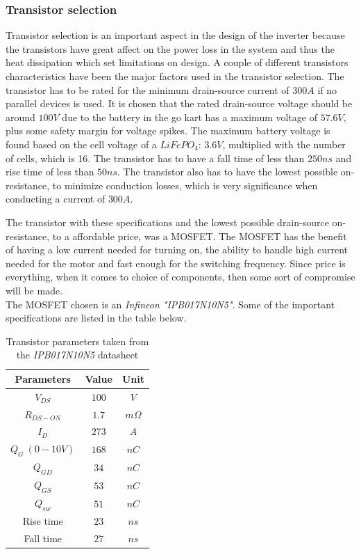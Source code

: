 \subsubsection{Transistor selection}
Transistor selection is an important aspect in the design of the inverter because the transistors have great affect on the power loss in the system and thus the heat dissipation which set limitations on design. 
A couple of different transistors characteristics have been the major factors used in the transistor selection.
The transistor has to be rated for the minimum drain-source current of $300 A$ if no parallel devices is used. It is chosen that the rated drain-source voltage should be around $100 V$ due to the battery in the go kart has a maximum voltage of $57.6V$, plus some safety margin for voltage spikes. 
The maximum battery voltage is found based on the cell voltage of a $LiFePO_4$: $3.6 V$, multiplied with the number of cells, which is 16. The transistor has to have a fall time of less than $250ns$ and rise time of less than $50ns$. The transistor also has to have the lowest possible on-resistance, to minimize conduction losses, which is very significance when conducting a current of $300A$.

The transistor with these specifications and the lowest possible drain-source on-resistance, to a affordable price, was a MOSFET. The MOSFET has the benefit of having a low current needed for turning on, the ability to handle high current needed for the motor and fast enough for the switching frequency. Since price is everything, when it comes to choice of components, then some sort of compromise will be made. \\

The MOSFET chosen is an \textit{Infineon "IPB017N10N5"}. Some of the important specifications are listed in the table below.
\begin{table} [H]
\centering
 \begin{tabular}{|c|c|c|} 
 \hline
 \textbf{Parameters} & \textbf{Value} & \textbf{Unit} \\
 \hline
 \textbf{$V_{DS}$} & $100$ & $V$ \\  
 \hline
 \textbf{$R_{DS-ON}$} & $1.7$ & $m\Omega$ \\
 \hline
 \textbf{$I_D$} & $273$ & $A$ \\
 \hline
 \textbf{$Q_G\ (0-10V)$} & $168$ & $nC$ \\
 \hline
 \textbf{$Q_{GD}$} & $34$ & $nC$ \\
 \hline
 \textbf{$Q_{GS}$} & $53$ & $nC$ \\
 \hline
 \textbf{$Q_{sw}$} & $51$ & $nC$ \\
 \hline
 Rise time & $23$ & $ns$ \\
 \hline
 Fall time & $27$ & $ns$ \\
 \hline
\end{tabular}
\caption{Transistor parameters taken from the \textit{IPB017N10N5} datasheet}
\end{table}

